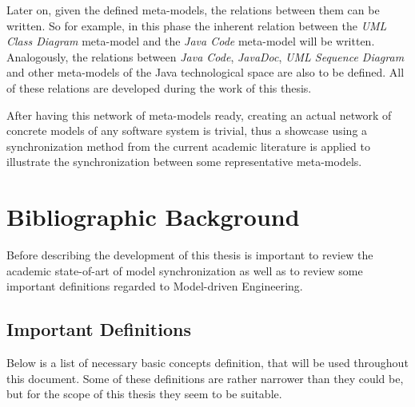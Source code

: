 \documentclass[tuberlin,cic,tc,openright,english,noabntcite]{iiufrgs}
\begin{document}
Later on, given the defined meta-models, the relations between them can be written. So for example, in this phase the inherent relation between the \emph{UML Class Diagram} meta-model and the \emph{Java Code} meta-model will be written. Analogously, the relations between \emph{Java Code}, \emph{JavaDoc}, \emph{UML Sequence Diagram} and other meta-models of the Java technological space are also to be defined. All of these relations are developed during the work of this thesis.

After having this network of meta-models ready, creating an actual network of concrete models of any software system is trivial, thus a showcase using a synchronization method from the current academic literature is applied to illustrate the synchronization between some representative meta-models.


\chapter{Bibliographic Background}
Before describing the development of this thesis is important to review the academic state-of-art of model synchronization as well as to review some important definitions regarded to Model-driven Engineering.

\section{Important Definitions}
Below is a list of necessary basic concepts definition, that will be used throughout this document. Some of these definitions are rather narrower than they could be, but for the scope of this thesis they seem to be suitable.
\end{document}
